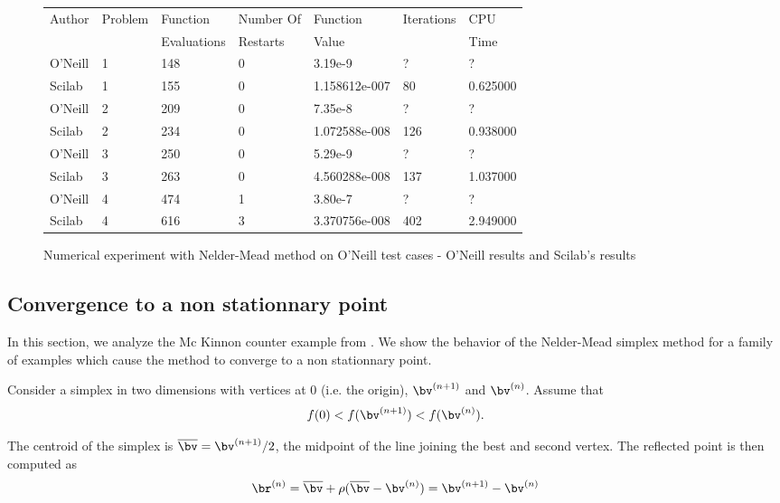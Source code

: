 \begin{figure}[htbp]
\begin{center}
\begin{tabular}{|l|l|l|l|l|l|l|}
\hline
Author & Problem & Function    & Number Of & Function  & Iterations & CPU\\
       &         & Evaluations & Restarts  & Value     &            & Time \\
\hline
O'Neill & 1 & 148 & 0 & 3.19e-9       & ?  & ? \\
Scilab  & 1 & 155 & 0 & 1.158612e-007 & 80 & 0.625000 \\
\hline
O'Neill & 2 & 209 & 0 & 7.35e-8        & ?   & ?  \\
Scilab  & 2 & 234 & 0 & 1.072588e-008  & 126 & 0.938000 \\
\hline
O'Neill & 3 & 250 & 0 & 5.29e-9       & ?   & ? \\
Scilab  & 3 & 263 & 0 & 4.560288e-008 & 137 & 1.037000 \\
\hline
O'Neill & 4 & 474 & 1 & 3.80e-7       & ?   & ? \\
Scilab  & 4 & 616 & 3 & 3.370756e-008 & 402 & 2.949000 \\
\hline
\end{tabular}
\end{center}
\caption{Numerical experiment with Nelder-Mead method on O'Neill test cases - O'Neill results and Scilab's results}
\label{fig-nm-oneill-table}
\end{figure}

\subsection{Convergence to a non stationnary point}
\label{section-mcKinnon}

In this section, we analyze the Mc Kinnon counter example 
from \cite{589109}. We show the behavior of the 
Nelder-Mead simplex method for a family of examples which cause the 
method to converge to a non stationnary point.

Consider a simplex in two dimensions with vertices at 0 (i.e. the origin),
$\bv^{(n+1)}$ and $\bv^{(n)}$. Assume that 
\begin{eqnarray}
\label{mckinnon-sortedfv}
f(0) < f(\bv^{(n+1)}) < f(\bv^{(n)}).
\end{eqnarray}

The centroid of the simplex is $\overline{\bv} = \bv^{(n+1)}/2$, the midpoint
of the line joining the best and second vertex. The reflected 
point is then computed as 
\begin{eqnarray}
\label{mckinnon-reflection}
\br^{(n)} = \overline{\bv} + \rho ( \overline{\bv} - \bv^{(n)} ) 
= \bv^{(n+1)} - \bv^{(n)}
\end{eqnarray}

